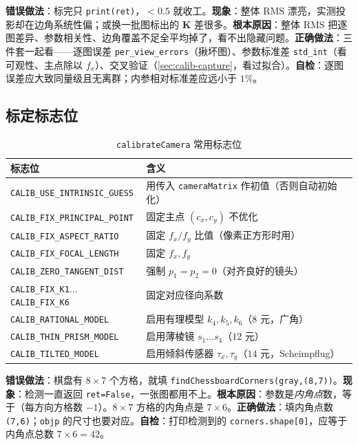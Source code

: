 \begin{pitfall}
\textbf{错误做法}：标完只 \texttt{print(ret)}，$<0.5$ 就收工。\textbf{现象}：整体 RMS 漂亮，实测投影却在边角系统性偏；或换一批图标出的 $\mathbf{K}$ 差很多。\textbf{根本原因}：整体 RMS 把逐图差异、参数相关性、边角覆盖不足全平均掉了，看不出隐藏问题。\textbf{正确做法}：三件套一起看——逐图误差 \texttt{per\_view\_errors}（揪坏图）、参数标准差 \texttt{std\_int}（看可观性、主点除以 $f_x$）、交叉验证（\cref{sec:calib-capture}，看过拟合）。\textbf{自检}：逐图误差应大致同量级且无离群；内参相对标准差应远小于 $1\%$。
\end{pitfall}

\subsection{标定标志位}

\begin{table}[ht]\centering\small
\caption{\texttt{calibrateCamera} 常用标志位\cite{opencv2024calib}}
\label{tab:calib-flags}
\begin{tabular}{ll}
\toprule
标志位 & 含义 \\
\midrule
\texttt{CALIB\_USE\_INTRINSIC\_GUESS} & 用传入 \texttt{cameraMatrix} 作初值（否则自动初始化）\\
\texttt{CALIB\_FIX\_PRINCIPAL\_POINT} & 固定主点 $(c_x,c_y)$ 不优化 \\
\texttt{CALIB\_FIX\_ASPECT\_RATIO} & 固定 $f_x/f_y$ 比值（像素正方形时用）\\
\texttt{CALIB\_FIX\_FOCAL\_LENGTH} & 固定 $f_x,f_y$ \\
\texttt{CALIB\_ZERO\_TANGENT\_DIST} & 强制 $p_1=p_2=0$（对齐良好的镜头）\\
\texttt{CALIB\_FIX\_K1}$\ldots$\texttt{CALIB\_FIX\_K6} & 固定对应径向系数 \\
\texttt{CALIB\_RATIONAL\_MODEL} & 启用有理模型 $k_4,k_5,k_6$（$8$ 元，广角）\\
\texttt{CALIB\_THIN\_PRISM\_MODEL} & 启用薄棱镜 $s_1\ldots s_4$（$12$ 元）\\
\texttt{CALIB\_TILTED\_MODEL} & 启用倾斜传感器 $\tau_x,\tau_y$（$14$ 元，Scheimpflug）\\
\bottomrule
\end{tabular}
\end{table}

\begin{pitfall}
\textbf{错误做法}：棋盘有 $8\times7$ 个方格，就填 \texttt{findChessboardCorners(gray,(8,7))}。\textbf{现象}：检测一直返回 \texttt{ret=False}，一张图都用不上。\textbf{根本原因}：参数是\emph{内角点}数，等于（每方向方格数 $-1$）。$8\times7$ 方格的内角点是 $7\times6$。\textbf{正确做法}：填内角点数 \texttt{(7,6)}；\texttt{objp} 的尺寸也要对应。\textbf{自检}：打印检测到的 \texttt{corners.shape[0]}，应等于内角点总数 $7\times6=42$。
\end{pitfall}

